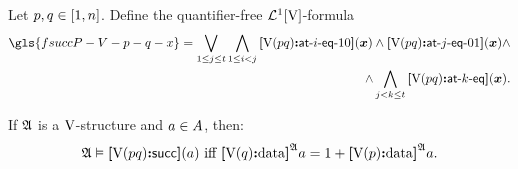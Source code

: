 \begin{definition}
Let $p, q \in [1, n]$. Define the quantifier-free $\mathcal{L}^{1}[\mathrm{V}]$-formula
\begin{align*}
  \gls{fsuccP-V-p-q-x} =
  \bigvee_{1 \leq \jj \leq \tbit} \bigwedge_{1 \leq \ii < \jj}
  \feqPPIO\VS\posp\posq\ii(\xx) \land
  \feqPPOI\VS\posp\posq\jj(\xx) \land \\
  \land \bigwedge_{\jj < \kk \leq \tbit}
  \feqPP\VS\posp\posq\kk(\xx).
\end{align*}
\end{definition}
If $\mathfrak{A}$ is a $\mathrm{V}$-structure and $a \in A$,
then:
\[
  \miff{
  \StrA \vDash \fsuccP\VS\posp\posq(\ea)}{
  \data{\VSp\posq}\StrA\ea = 1 + \data{\VSp\posp}\StrA\ea}.
\]